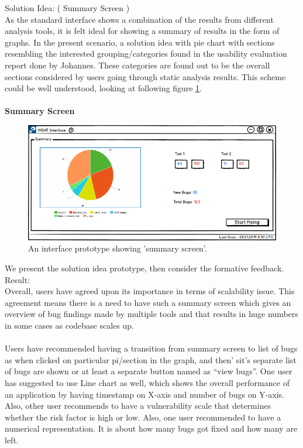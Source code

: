 Solution Idea: ( Summary Screen ) \\

As the standard interface shows a combination of the results from different analysis tools, it is felt ideal for showing a summary of results in the form of graphs. In the present scenario, a solution idea with pie chart with sections resembling the interested grouping/categories found in the usability evaluation report done by Johannes. These categories are found out to be the overall sections considered by users going through static analysis results.  This scheme could be well understood, looking at following figure \ref{fig:ux1_summary_screen}. \\ \\

\textbf{Summary Screen}
\begin{figure}[hbt!]
	\centering
	\includegraphics[width=\linewidth]{figures/ux1_summary_screen}
	\caption{An interface prototype showing 'summary screen'.}
	\label{fig:ux1_summary_screen}
\end{figure}

We present the solution idea prototype, then consider the formative feedback. \\

Result: \\

Overall, users have agreed upon its importance in terms of scalability issue. This agreement means there is a need to have such a summary screen which gives an overview of bug findings made by multiple tools and that results in huge numbers in some cases as codebase scales up. \\ \\

Users have recommended having a transition from summary screen to list of bugs as when clicked on particular pi/section in the graph, and then’  sit’s separate list of bugs are shown or at least a separate button named as “view bugs”. One user has suggested to use Line chart as well, which shows the overall performance of an application by having timestamp on X-axis and number of bugs on Y-axis. Also, other user recommends to have a vulnerability scale that determines whether the risk factor is high or low. Also, one user recommended to have a numerical representation. It is about how many bugs got fixed and how many are left. \\ \\

